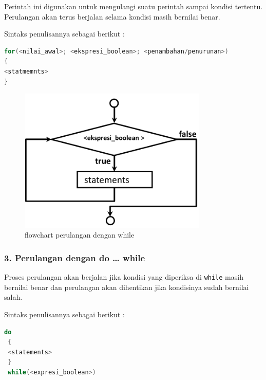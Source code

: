 Perintah ini digunakan untuk mengulangi suatu perintah sampai kondisi
tertentu. Perulangan akan terus berjalan selama kondisi masih bernilai
benar.

Sintaks penulisannya sebagai berikut :

\begin{lstlisting}[language=c++, numbers=none]
for(<nilai_awal>; <ekspresi_boolean>; <penambahan/penurunan>)
{
<statmemnts>
}
\end{lstlisting}

\begin{figure}[htbp]
\centering
\includegraphics[width=0.8\textwidth]{../manuscript/images/Capture2-9.PNG}
\caption{flowchart perulangan dengan while}
\end{figure}

\subsubsection{3. Perulangan dengan do \ldots{} while}\label{perulangan-dengan-do-while}

Proses perulangan akan berjalan jika kondisi yang diperiksa di
\texttt{while} masih bernilai benar dan perulangan akan dihentikan jika
kondisinya sudah bernilai salah.

Sintaks penulisannya sebagai berikut :

\begin{lstlisting}[language=c++, numbers=none]
 do
 {
 <statements>
 }
 while(<expresi_boolean>)
\end{lstlisting}

